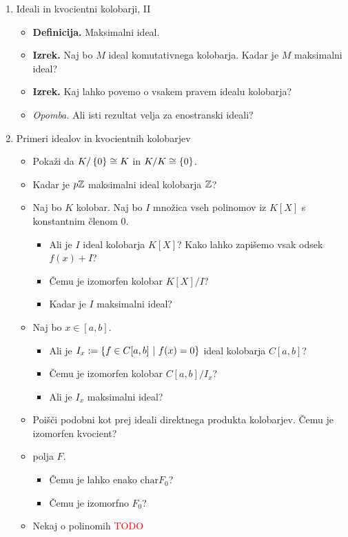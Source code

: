 \begin{enumerate}
    \item Ideali in kvocientni kolobarji, II
    \begin{itemize}
        \item \colorbox{purple!30}{\textbf{Definicija.}} Maksimalni ideal.
        \item \colorbox{blue!30}{\textbf{Izrek.}}  Naj bo $M$ ideal komutativnega kolobarja. Kadar je $M$ maksimalni ideal?
        \item \colorbox{blue!30}{\textbf{Izrek.}} Kaj lahko povemo o vsakem pravem idealu kolobarja?
        \item \colorbox{yellow!30}{\emph{Opomba.}} Ali isti rezultat velja za enostranski ideali?
    \end{itemize}

    \item Primeri idealov in kvocientnih kolobarjev
    \begin{itemize}
        \item Pokaži da $K/ \left\{0\right\} \cong K$ in $K/K \cong \left\{0\right\}$.
        \item Kadar je $p\mathbb{Z}$ maksimalni ideal kolobarja $\mathbb{Z}$?
        \item Naj bo $K$ kolobar. Naj bo $I$ množica vseh polinomov iz $K[X]$ s konstantnim členom $0$.
        \begin{itemize}
            \item Ali je $I$ ideal kolobarja $K[X]$? Kako lahko zapišemo vsak odsek $f(x) + I$?
            \item Čemu je izomorfen kolobar $K[X]/I$?
            \item Kadar je $I$ maksimalni ideal?
        \end{itemize}
        \item Naj bo $x \in [a, b]$.
        \begin{itemize}
            \item Ali je $I_x := \left\{f \in C[a,b] \ | \ f(x) = 0\right\}$ ideal kolobarja $C[a, b]$?
            \item Čemu je izomorfen kolobar $C[a, b]/I_x$?
            \item Ali je $I_x$ maksimalni ideal?
        \end{itemize}
        \item Poišči podobni kot prej ideali direktnega produkta kolobarjev. Čemu je izomorfen kvocient?
        \item {} polja $F$.
        \begin{itemize}
            \item Čemu je lahko enako $\text{char} F_0$?
            \item Čemu je izomorfno $F_0$?
        \end{itemize}
        \item Nekaj o polinomih \textcolor{red}{TODO}
    \end{itemize}
\end{enumerate}